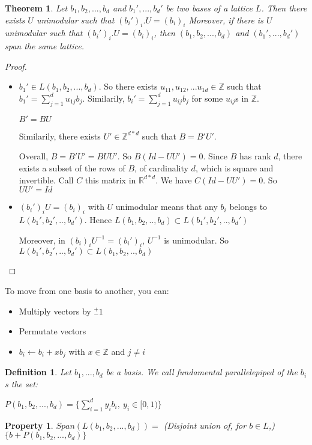 \documentclass[a4paper,10pt]{article}
\newtheorem{definition}{Definition}
\newtheorem{theorem}{Theorem}
\newtheorem{proposition}{Property}
\begin{document}
\begin{theorem}
Let $b_1, b_2,...,b_d$ and $b_1',...,b_d'$ be two bases of a lattice $L$.
Then there exists $U$ unimodular such that $(b_i')_i . U=(b_i)_i$
Moreover, if there is $U$ unimodular such that $(b_i')_i . U=(b_i)_i$, then $(b_1,b_2,...,b_d)$ and $(b_1',...,b_d')$ span the same lattice.
\end{theorem}

\begin{proof}
\begin{itemize}
\item $b_1' \in L(b_1,b_2,...,b_d)$. So there exists  $u_{1 1},u_{1 2},...u_{1 d} \in \mathbb{Z}$ such that $b_1'= \sum_{j=1}^d u_{1 j} b_j$. Similarily, $b_i'=  \sum_{j=1}^d u_{i j} b_j$ for some $u_{i j}$s in $\mathbb{Z}$.

$B' = B U$ 

Similarily, there exists $U' \in \mathbb{Z}^{d*d}$ such that $B = B' U'$.

Overall, $B= B' U' = B U U'$. So $B(Id-U U')=0$.
Since $B$ has rank $d$, there exists a subset of the rows of $B$, of cardinality $d$, which is square and invertible. Call $C$ this matrix in $\mathbb{R}^{d*d}$. We have $C(Id-U U')=0$. So $U U'=Id$
\item $(b_i')_i U = (b_i)_i$ with $U$ unimodular means that any $b_i$ belongs to $L(b_1',b_2',..,b_d')$. Hence $L(b_1,b_2,..,b_d) \subset L(b_1',b_2',..,b_d')$

Moreover, in $(b_i)_i U^{-1} = (b_i')_i$, $U^{-1}$ is unimodular. So $L(b_1',b_2',..,b_d') \subset L(b_1,b_2,..,b_d)$
\end{itemize}
\end{proof}

To move from one basis to another, you can:
\begin{itemize}
\item Multiply vectors by $^+_- 1$
\item Permutate vectors
\item $b_i \leftarrow b_i + x b_j$ with $x \in \mathbb{Z}$ and $j \neq i$ 
\end{itemize}

\begin{definition}
Let $b_1,...,b_d$ be a basis. We call fundamental parallelepiped of the $b_i$s the set:

$P(b_1,b_2,...,b_d)=\{\sum^d_{i=1} y_i b_i, \ y_i \in [0,1) \}$
\end{definition}

\begin{proposition}
$Span(L(b_1,b_2,...,b_d))=$ (Disjoint union of, for $b \in L$,) $\{ b+P(b_1,b_2,...,b_d) \}$
\end{proposition}
\end{document}
